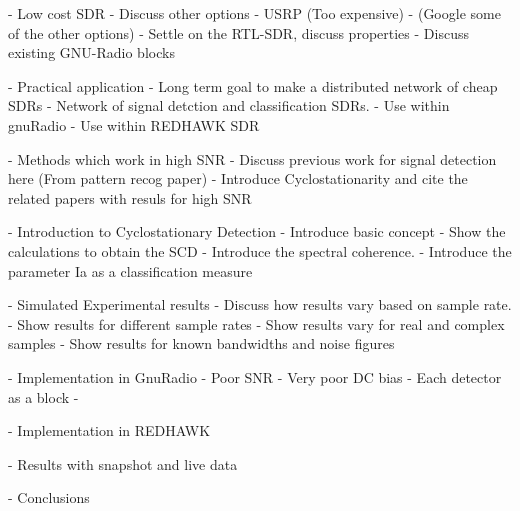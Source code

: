 

 - Low cost SDR
 	- Discuss other options
 	- USRP (Too expensive)
 	- (Google some of the other options)
 	- Settle on the RTL-SDR, discuss properties
 	- Discuss existing GNU-Radio blocks
 
 - Practical application
	- Long term goal to make a distributed network of cheap SDRs
	- Network of signal detction and classification SDRs.
	- Use within gnuRadio
	- Use within REDHAWK SDR
   
 - Methods which work in high SNR
 	- Discuss previous work for signal detection here (From pattern recog paper)
 	- Introduce Cyclostationarity and cite the related papers with resuls for high
 	SNR
 
 - Introduction to Cyclostationary Detection
 	- Introduce basic concept
 	- Show the calculations to obtain the SCD
 	- Introduce the spectral coherence.
 	- Introduce the parameter Ia as a classification measure
 
 - Simulated Experimental results
 	- Discuss how results vary based on sample rate.
 	- Show results for different sample rates
 	- Show results vary for real and complex samples
 	- Show results for known bandwidths and noise figures
 	
 - Implementation in GnuRadio
 	- Poor SNR
 	- Very poor DC bias
 	-  Each detector as a block
 	- 

 - Implementation in REDHAWK
 
 - Results with snapshot and live data
 
 - Conclusions

